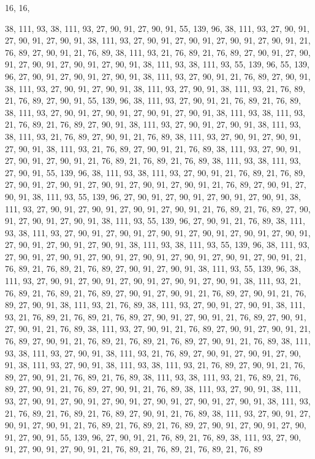16, 16,

38, 111, 93, 38, 111, 93, 27, 90, 91, 27, 90, 91, 55, 139, 96, 38,
111, 93, 27, 90, 91, 27, 90, 91, 27, 90, 91, 38, 111, 93, 27, 90,
91, 27, 90, 91, 27, 90, 91, 27, 90, 91, 21, 76, 89, 27, 90, 91,
21, 76, 89, 38, 111, 93, 21, 76, 89, 21, 76, 89, 27, 90, 91, 27,
90, 91, 27, 90, 91, 27, 90, 91, 27, 90, 91, 38, 111, 93, 38, 111,
93, 55, 139, 96, 55, 139, 96, 27, 90, 91, 27, 90, 91, 27, 90, 91,
38, 111, 93, 27, 90, 91, 21, 76, 89, 27, 90, 91, 38, 111, 93, 27,
90, 91, 27, 90, 91, 38, 111, 93, 27, 90, 91, 38, 111, 93, 21, 76,
89, 21, 76, 89, 27, 90, 91, 55, 139, 96, 38, 111, 93, 27, 90, 91,
21, 76, 89, 21, 76, 89, 38, 111, 93, 27, 90, 91, 27, 90, 91, 27,
90, 91, 27, 90, 91, 38, 111, 93, 38, 111, 93, 21, 76, 89, 21, 76,
89, 27, 90, 91, 38, 111, 93, 27, 90, 91, 27, 90, 91, 38, 111, 93,
38, 111, 93, 21, 76, 89, 27, 90, 91, 21, 76, 89, 38, 111, 93, 27,
90, 91, 27, 90, 91, 27, 90, 91, 38, 111, 93, 21, 76, 89, 27, 90,
91, 21, 76, 89, 38, 111, 93, 27, 90, 91, 27, 90, 91, 27, 90, 91,
21, 76, 89, 21, 76, 89, 21, 76, 89, 38, 111, 93, 38, 111, 93, 27,
90, 91, 55, 139, 96, 38, 111, 93, 38, 111, 93, 27, 90, 91, 21, 76,
89, 21, 76, 89, 27, 90, 91, 27, 90, 91, 27, 90, 91, 27, 90, 91,
27, 90, 91, 21, 76, 89, 27, 90, 91, 27, 90, 91, 38, 111, 93, 55,
139, 96, 27, 90, 91, 27, 90, 91, 27, 90, 91, 27, 90, 91, 38, 111,
93, 27, 90, 91, 27, 90, 91, 27, 90, 91, 27, 90, 91, 21, 76, 89,
21, 76, 89, 27, 90, 91, 27, 90, 91, 27, 90, 91, 38, 111, 93, 55,
139, 96, 27, 90, 91, 21, 76, 89, 38, 111, 93, 38, 111, 93, 27, 90,
91, 27, 90, 91, 27, 90, 91, 27, 90, 91, 27, 90, 91, 27, 90, 91,
27, 90, 91, 27, 90, 91, 27, 90, 91, 38, 111, 93, 38, 111, 93, 55,
139, 96, 38, 111, 93, 27, 90, 91, 27, 90, 91, 27, 90, 91, 27, 90,
91, 27, 90, 91, 27, 90, 91, 27, 90, 91, 21, 76, 89, 21, 76, 89,
21, 76, 89, 27, 90, 91, 27, 90, 91, 38, 111, 93, 55, 139, 96, 38,
111, 93, 27, 90, 91, 27, 90, 91, 27, 90, 91, 27, 90, 91, 27, 90,
91, 38, 111, 93, 21, 76, 89, 21, 76, 89, 21, 76, 89, 27, 90, 91,
27, 90, 91, 21, 76, 89, 27, 90, 91, 21, 76, 89, 27, 90, 91, 38,
111, 93, 21, 76, 89, 38, 111, 93, 27, 90, 91, 27, 90, 91, 38, 111,
93, 21, 76, 89, 21, 76, 89, 21, 76, 89, 27, 90, 91, 27, 90, 91,
21, 76, 89, 27, 90, 91, 27, 90, 91, 21, 76, 89, 38, 111, 93, 27,
90, 91, 21, 76, 89, 27, 90, 91, 27, 90, 91, 21, 76, 89, 27, 90,
91, 21, 76, 89, 21, 76, 89, 21, 76, 89, 27, 90, 91, 21, 76, 89,
38, 111, 93, 38, 111, 93, 27, 90, 91, 38, 111, 93, 21, 76, 89, 27,
90, 91, 27, 90, 91, 27, 90, 91, 38, 111, 93, 27, 90, 91, 38, 111,
93, 38, 111, 93, 21, 76, 89, 27, 90, 91, 21, 76, 89, 27, 90, 91,
21, 76, 89, 21, 76, 89, 38, 111, 93, 38, 111, 93, 21, 76, 89, 21,
76, 89, 27, 90, 91, 21, 76, 89, 27, 90, 91, 21, 76, 89, 38, 111,
93, 27, 90, 91, 38, 111, 93, 27, 90, 91, 27, 90, 91, 27, 90, 91,
27, 90, 91, 27, 90, 91, 27, 90, 91, 38, 111, 93, 21, 76, 89, 21,
76, 89, 21, 76, 89, 27, 90, 91, 21, 76, 89, 38, 111, 93, 27, 90,
91, 27, 90, 91, 27, 90, 91, 21, 76, 89, 21, 76, 89, 21, 76, 89,
27, 90, 91, 27, 90, 91, 27, 90, 91, 27, 90, 91, 55, 139, 96, 27,
90, 91, 21, 76, 89, 21, 76, 89, 38, 111, 93, 27, 90, 91, 27, 90,
91, 27, 90, 91, 21, 76, 89, 21, 76, 89, 21, 76, 89, 21, 76, 89
